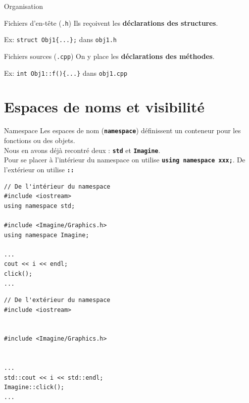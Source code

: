 \begin{frame}{Organisation}
    \begin{block}{Fichiers d'en-tête (\texttt{.h})}
        Ils reçoivent les \textbf{déclarations des structures}.
        \begin{center}
            Ex: \texttt{struct Obj1\{...\};} dans \texttt{obj1.h}
        \end{center}
    \end{block}
    \begin{block}{Fichiers sources (\texttt{.cpp})}
        On y place les \textbf{déclarations des méthodes}.
        \begin{center}
            Ex: \texttt{int Obj1::f()\{...\}} dans \texttt{obj1.cpp}
        \end{center}
    \end{block}
\end{frame}

\section{Espaces de noms et visibilité}

\begin{frame}[fragile]{Namespace}
    Les espaces de nom (\texttt{\textbf{namespace}}) définissent un conteneur pour les fonctions ou des objets.\\
    Nous en avons déjà recontré deux : \textbf{\texttt{std}} et \textbf{\texttt{Imagine}}.\\
    Pour se placer à l'intérieur du namespace on utilise \textbf{\texttt{using namespace xxx;}}.
    De l'extérieur on utilise \texttt{\textbf{::}}
\begin{minipage}{0.48\linewidth}
        \begin{verbatim}
// De l'intérieur du namespace
#include <iostream>
using namespace std;

#include <Imagine/Graphics.h>
using namespace Imagine;

...
cout << i << endl;
click();
...
        \end{verbatim}
    
\end{minipage}
\hfill
\begin{minipage}{0.48\linewidth}
    
        \begin{verbatim}
// De l'extérieur du namespace
#include <iostream>


#include <Imagine/Graphics.h>


...
std::cout << i << std::endl;
Imagine::click();
...
        \end{verbatim}
    
\end{minipage}

\end{frame}

